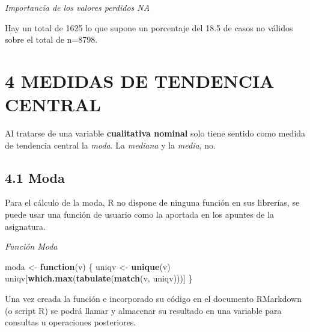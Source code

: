 \documentclass[
  12 pt,
  a4paper,
]{article}
\newenvironment{Shaded}{\begin{snugshade}}{\end{snugshade}}
\newcommand{\CommentTok}[1]{\textcolor[rgb]{0.56,0.35,0.01}{\textit{#1}}}
\newcommand{\ControlFlowTok}[1]{\textcolor[rgb]{0.13,0.29,0.53}{\textbf{#1}}}
\newcommand{\FunctionTok}[1]{\textcolor[rgb]{0.13,0.29,0.53}{\textbf{#1}}}
\newcommand{\NormalTok}[1]{#1}
\newcommand{\OtherTok}[1]{\textcolor[rgb]{0.56,0.35,0.01}{#1}}
\newcommand{\SpecialCharTok}[1]{\textcolor[rgb]{0.81,0.36,0.00}{\textbf{#1}}}
\begin{document}
\emph{Importancia de los valores perdidos NA}

Hay un total de 1625 lo que supone un porcentaje del 18.5 de casos no
válidos sobre el total de n=8798.

\newpage

\hypertarget{medidas-de-tendencia-central}{%
\section{4 MEDIDAS DE TENDENCIA
CENTRAL}\label{medidas-de-tendencia-central}}

Al tratarse de una variable \textbf{cualitativa nominal} solo tiene
sentido como medida de tendencia central la \emph{moda}. La
\emph{mediana} y la \emph{media}, no.

\hypertarget{moda}{%
\subsection{4.1 Moda}\label{moda}}

Para el cálculo de la moda, R no dispone de ninguna función en sus
librerías, se puede usar una función de usuario como la aportada en los
apuntes de la asignatura.

\emph{Función Moda}

\begin{Shaded}
\begin{Highlighting}[]
\NormalTok{moda }\OtherTok{\textless{}{-}} \ControlFlowTok{function}\NormalTok{(v) \{}
\NormalTok{  uniqv }\OtherTok{\textless{}{-}} \FunctionTok{unique}\NormalTok{(v)}
\NormalTok{  uniqv[}\FunctionTok{which.max}\NormalTok{(}\FunctionTok{tabulate}\NormalTok{(}\FunctionTok{match}\NormalTok{(v, uniqv)))]}
\NormalTok{\}}
\end{Highlighting}
\end{Shaded}

Una vez creada la función e incorporado su código en el documento
RMarkdown (o script R) se podrá llamar y almacenar su resultado en una
variable para consultas u operaciones posteriores.

\begin{Shaded}
\end{Shaded}
\end{document}
